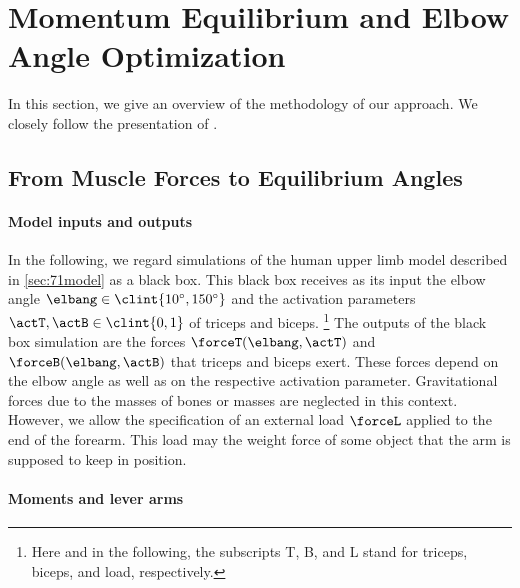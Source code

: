 \section{Momentum Equilibrium and Elbow Angle Optimization}
\label{sec:72methodology}


\noindent
In this section, we give an overview of the methodology of our approach.
We closely follow the presentation of \cite{Valentin18Gradient}.



\subsection{From Muscle Forces to Equilibrium Angles}
\label{sec:721equilibrium}

\paragraph{Model inputs and outputs}

In the following, we regard simulations of the
human upper limb model described in \cref{sec:71model} as a black box.
This black box receives as its input
the elbow angle $\elbang \in \clint{\ang{10}, \ang{150}}$
and the activation parameters $\actT, \actB \in \clint{0, 1}$
of triceps and biceps.%
\footnote{%
  Here and in the following, the subscripts T, B, and L stand for
  triceps, biceps, and load, respectively.%
}
The outputs of the black box simulation are the forces
$\forceT(\elbang, \actT)$ and $\forceB(\elbang, \actB)$
that triceps and biceps exert.
These forces depend on the elbow angle as well as on the respective
activation parameter.
Gravitational forces due to the masses of bones or masses
are neglected in this context.
However, we allow the specification of an external load $\forceL$
applied to the end of the forearm.
This load may the weight force of some object
that the arm is supposed to keep in position.

\paragraph{Moments and lever arms}

